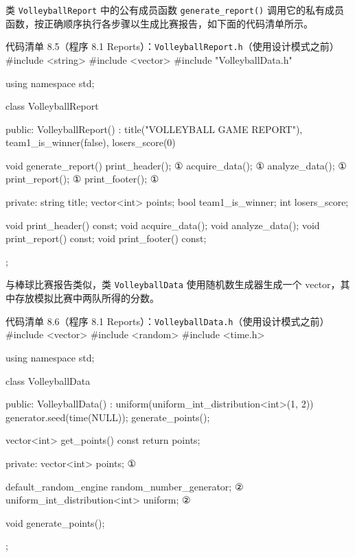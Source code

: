 类 \texttt{Volleyball\allowbreak{}Report} 中的公有成员函数 \texttt{generate\_\allowbreak{}report(\allowbreak{})\allowbreak{}} 调用它的私有成员函数，按正确顺序执行各步骤以生成比赛报告，如下面的代码清单所示。

\begin{codeboxt}{代码清单 8.5（程序 8.1 Reports）：\texttt{Volleyball\allowbreak{}Report.\allowbreak{}h}（使用设计模式之前）}
#include <string>
#include <vector>
#include "VolleyballData.h"

using namespace std;

class VolleyballReport
{
public:
    VolleyballReport()
        : title("VOLLEYBALL GAME REPORT"),
          team1_is_winner(false), losers_score(0) {}

    void generate_report()
    {
        print_header();      ①
        acquire_data();      ①
        analyze_data();      ①
        print_report();      ①
        print_footer();      ①
    }

private:
    string title;
    vector<int> points;
    bool team1_is_winner;
    int  losers_score;

    void print_header() const;
    void acquire_data();
    void analyze_data();
    void print_report() const;
    void print_footer() const;
};
\end{codeboxt}
\par

与棒球比赛报告类似，类 \texttt{Volleyball\allowbreak{}Data} 使用随机数生成器生成一个 vector，其中存放模拟比赛中两队所得的分数。

\begin{codeboxt}{代码清单 8.6（程序 8.1 Reports）：\texttt{Volleyball\allowbreak{}Data.\allowbreak{}h}（使用设计模式之前）}
#include <vector>
#include <random>
#include <time.h>

using namespace std;

class VolleyballData
{
public:
    VolleyballData() : uniform(uniform_int_distribution<int>(1, 2))
    {
        generator.seed(time(NULL));
        generate_points();
    }

    vector<int> get_points() const { return points; }

private:
    vector<int> points;                            ①

    default_random_engine random_number_generator; ②
    uniform_int_distribution<int> uniform;         ②

    void generate_points();
};
\end{codeboxt}
\par
{}\par

